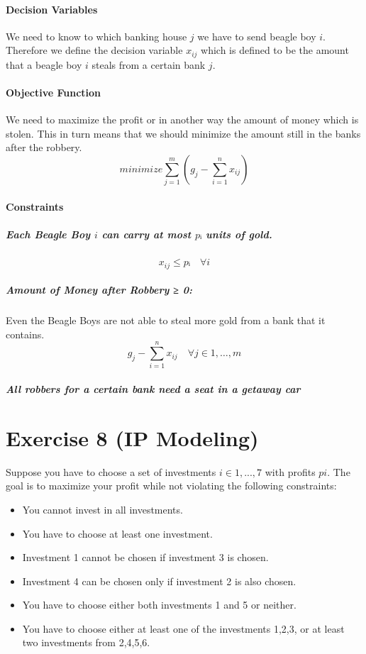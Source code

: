 \documentclass[a4paper, 12pt]{report}
\begin{document}
\paragraph{Decision Variables}

We need to know to which banking house $j$ we have to send beagle boy $i$.
Therefore we define the decision variable $x_{ij}$ which is defined to be the
amount that a beagle boy $i$ steals from a certain bank $j$.

\paragraph{Objective Function}

We need to maximize the profit or in another way the amount of money which is
stolen. This in turn means that we should minimize the amount still in the
banks after the robbery.
\[
    minimize ∑_{j=1}^{m} \left( g_j - ∑_{i=1}^{n} x_{ij} \right)
\]

\paragraph{Constraints}

\subparagraph{Each Beagle Boy $i$ can carry at most $pᵢ$ units of gold.}
\[
    x_{ij} ≤ pᵢ \quad ∀i
\]

\subparagraph{Amount of Money after Robbery ≥ 0:} Even the Beagle Boys are not
able to steal more gold from a bank that it contains.
\[
    g_j - ∑_{i=1}^{n} x_{ij} \quad ∀j ∈ {1,…,m}
\]

\subparagraph{All robbers for a certain bank need a seat in a getaway car}

\section{Exercise 8 (IP Modeling)}

Suppose you have to choose a set of investments $i ∈ {1, ..., 7}$ with profits
$pi$. The goal is to maximize your profit while not violating the following
constraints:

\begin{itemize}
    \item You cannot invest in all investments.
    \item You have to choose at least one investment.
    \item Investment 1 cannot be chosen if investment 3 is chosen.
    \item Investment 4 can be chosen only if investment 2 is also chosen.
    \item You have to choose either both investments 1 and 5 or neither.
    \item You have to choose either at least one of the investments 1,2,3, or
          at least two investments from 2,4,5,6.
\end{itemize}
\end{document}
